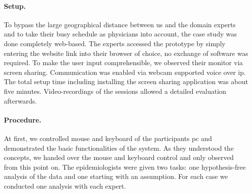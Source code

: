 \documentclass[journal]{style/vgtc} 			          %
\begin{document}
\paragraph{Setup.} To bypass the large geographical distance between us and the domain experts and to take their busy schedule as physicians into account, the case study was done completely web-based.
%
The experts accessed the prototype by simply entering the website link into their browser of choice, no exchange of software was required.
%
%
To make the user input comprehensible, we observed their monitor via screen sharing.
%
Communication was enabled via webcam supported voice over ip.
%
The total setup time including installing the screen sharing application was about five minutes.
%
Video-recordings of the sessions allowed a detailed evaluation afterwards.%
%
\paragraph{Procedure.}
At first, we controlled mouse and keyboard of the participants pc and demonstrated the basic functionalities of the system.
%
%
As they understood the concepts, we handed over the mouse and keyboard control and only observed from this point on.
%
The epidemiologists were given two tasks: one hypothesis-free analysis of the data and one starting with an assumption.
%
For each case we conducted one analysis with each expert.

\end{document}
